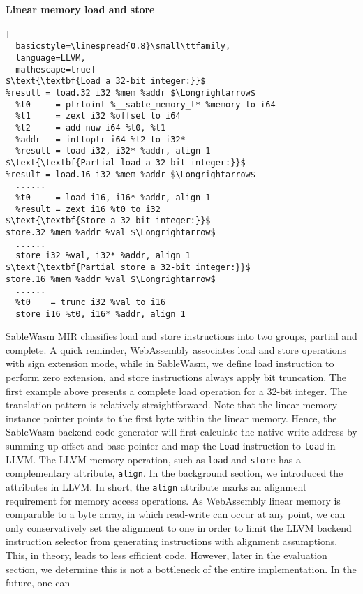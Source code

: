 \paragraph{Linear memory load and store} \quad
\begin{lstlisting}[
  basicstyle=\linespread{0.8}\small\ttfamily, 
  language=LLVM, 
  mathescape=true]
$\text{\textbf{Load a 32-bit integer:}}$
%result = load.32 i32 %mem %addr $\Longrightarrow$
  %t0     = ptrtoint %__sable_memory_t* %memory to i64
  %t1     = zext i32 %offset to i64
  %t2     = add nuw i64 %t0, %t1
  %addr   = inttoptr i64 %t2 to i32*
  %result = load i32, i32* %addr, align 1
$\text{\textbf{Partial load a 32-bit integer:}}$
%result = load.16 i32 %mem %addr $\Longrightarrow$
  ......
  %t0     = load i16, i16* %addr, align 1
  %result = zext i16 %t0 to i32
$\text{\textbf{Store a 32-bit integer:}}$
store.32 %mem %addr %val $\Longrightarrow$
  ......
  store i32 %val, i32* %addr, align 1
$\text{\textbf{Partial store a 32-bit integer:}}$
store.16 %mem %addr %val $\Longrightarrow$
  ...... 
  %t0    = trunc i32 %val to i16
  store i16 %t0, i16* %addr, align 1
\end{lstlisting}
SableWasm MIR classifies load and store instructions into two groups,
partial and complete. A quick reminder, WebAssembly associates load and store
operations with sign extension mode, while in SableWasm, we define load
instruction to perform zero extension, and store instructions always apply bit
truncation. The first example above presents a complete load operation for a
32-bit integer. The translation pattern is relatively straightforward. Note
that the linear memory instance pointer points to the first byte within the
linear memory. Hence, the SableWasm backend code generator will first calculate
the native write address by summing up offset and base pointer and map the
\texttt{Load} instruction to \texttt{load} in LLVM. The LLVM memory operation,
such as \texttt{load} and \texttt{store} has a complementary attribute,
\texttt{align}. In the background section, we introduced the attributes in
LLVM. In short, the \texttt{align} attribute marks an alignment requirement for
memory access operations. As WebAssembly linear memory is comparable to a byte
array, in which read-write can occur at any point, we can only conservatively
set the alignment to one in order to limit the LLVM backend instruction selector
from generating instructions with alignment assumptions. This, in theory, leads
to less efficient code. However, later in the evaluation section, we determine
this is not a bottleneck of the entire implementation. In the future, one can

